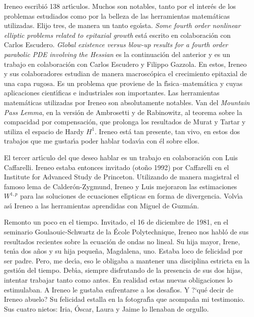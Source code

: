 Ireneo escribi\'o 138 art{\'\i}culos. Muchos son notables, tanto por el inter\'es de los problemas estudiados como por la belleza de las herramientas matem\'aticas utilizadas. Elijo tres, de manera un tanto ego{\'\i}sta. {\it Some fourth order nonlinear elliptic problems related to epitaxial growth }  est\'a escrito en colaboraci\'on con Carlos Escudero. {\it Global existence versus blow-up results for a fourth order parabolic PDE involving the Hessian} es la continuaci\'on del anterior y es un trabajo en colaboraci\'on con Carlos Escudero y Filippo Gazzola. En estos, Ireneo y sus colaboradores estudian de manera macrosc\'opica  el crecimiento epitaxial de una capa rugosa. Es un problema que proviene de la 
f{\'\i}sica--matem\'atica y cuyas aplicaciones cient{\'\i}ficas e industriales son importantes. Las herramientas matem\'aticas utilizadas por Ireneo son absolutamente notables. Van del \textit{Mountain Pass Lemma}, en la versi\'on de Ambrosetti y de Rabinowitz, al teorema sobre la compacidad por compensaci\'on, que prolonga los resultados de Murat y Tartar y utiliza el espacio de Hardy $H^1$. Ireneo est\'a tan presente, tan vivo, en estos dos trabajos que  me gustar{\'\i}a poder hablar   todav{\'\i}a  con \'el  sobre ellos.



El tercer art{\'\i}culo del que deseo hablar es un trabajo en colaboraci\'on con Luis Caffarelli. Ireneo estaba entonces invitado (oto\~no 1992) por Caffarelli en el Institute for Advanced Study de Princeton. Utilizando de manera magistral el famoso lema de Calder\'on-Zygmund, Ireneo y Luis mejoraron las estimaciones $W^{1, p}$ para las soluciones de ecuaciones el{\'\i}pticas  en forma de divergencia. Volv{\'\i}a as{\'\i} Ireneo a las herramientas aprendidas con Miguel de Guzm\'an.


Remonto un poco en el tiempo. Invitado, el 16 de diciembre de 1981, en el seminario Goulaouic-Schwartz de la \'Ecole Polytechnique, Ireneo nos habl\'o de sus resultados recientes sobre la ecuaci\'on de ondas no lineal. Su hija mayor, Irene, ten{\'\i}a dos a\~nos y su hija peque\~na, Magdalena, uno.  
Estaba loco de felicidad por ser padre. Pero, me dec{\'\i}a, eso le  
obligaba a  mantener una disciplina estricta en la gesti\'on del tiempo.  
Deb{\'\i}a, siempre disfrutando de la presencia de sus dos hijas, intentar  
trabajar tanto como antes. En realidad estas nuevas obligaciones lo  
estimulaban. A Ireneo le gustaba enfrentarse a los desaf{\'\i}os.
Y ?`qu\'e decir de Ireneo abuelo? Su felicidad estalla en la fotograf{\'\i}a  
que acompa\~na mi testimonio. Sus cuatro nietos: Iria, \'Oscar, Laura y  
Jaime lo llenaban de orgullo.

